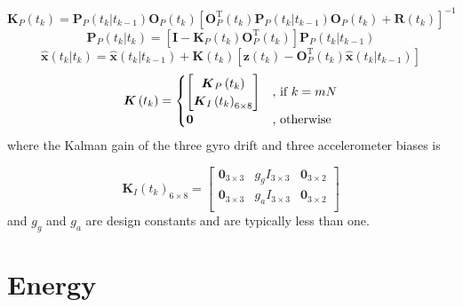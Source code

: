 \documentclass[a4paper]{report}
\numberwithin{equation}{chapter}
\newcommand{\mat}[1]{\boldsymbol{#1}}
\begin{document}
\begin{equation}
\mat{K}_P \left( t_k \right) = \mat{P}_P \left( t_k | t_{k - 1} \right) \mat{O}_P \left( t_k \right) \left[ \mat{O}^{\mathrm{T}}_P \left( t_k \right) \mat{P}_P \left( t_k | t_{k - 1} \right) \mat{O}_P \left( t_k \right) + \mat{R} \left( t_k \right) \right]^{-1}
\end{equation}
\begin{equation}
\mat{P}_P \left( t_k | t_k \right) = \left[ \mat{I} - \mat{K}_P \left( t_k \right) \mat{O}_P^{\mathrm{T}} \left( t_k \right) \right] \mat{P}_P \left( t_k | t_{k - 1} \right)
\end{equation}
\begin{equation}
\hat{\mat{x}} \left( t_k | t_k \right) = \hat{\mat{x}} \left( t_k | t_{k - 1} \right) + \mat{K} \left( t_k \right) \left[ \mat{z} \left( t_k \right) - \mat{O}_P^{\mathrm{T}} \left( t_k \right) \hat{\mat{x}} \left( t_k | t_{k - 1} \right) \right]
\end{equation}
\begin{equation}
\mat{K} \left( t_k \right) =
\begin{cases}
\begin{bmatrix}
\mat{K}_P \left( t_k \right)\\
\mat{K}_I \left( t_k \right)_{6 \times 8}\\
\end{bmatrix}
& \text{, if $ k = mN$} \\
\mat{0} & \text{, otherwise}
\end{cases}
\end{equation}
where the Kalman gain of the three gyro drift and three accelerometer biases is

\begin{equation}
\mat{K}_I \left( t_k \right)_{6 \times 8} =
\begin{bmatrix}
\mat{0}_{3 \times 3} & g_g I_{3 \times 3} & \mat{0}_{3 \times 2}\\
\mat{0}_{3 \times 3} & g_a I_{3 \times 3} & \mat{0}_{3 \times 2}\\
\end{bmatrix}
\end{equation}
and $g_g$ and $g_a$ are design constants and are typically less than one.




\clearpage\setcounter{page}{1}
\chapter[Energy]{Energy}
\end{document}
